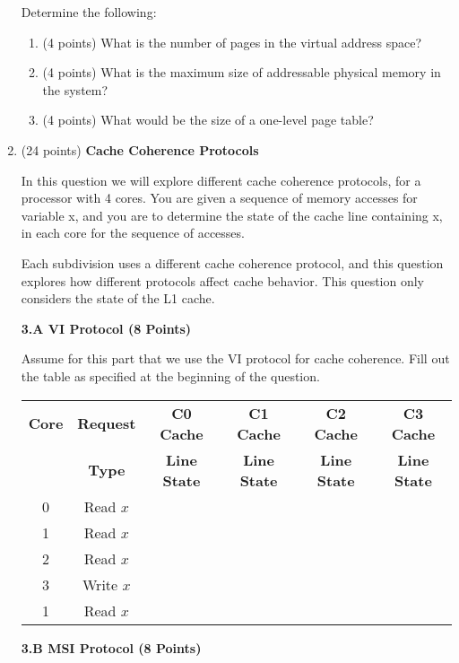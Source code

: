 \documentclass[a4paper,10pt]{article}
\begin{document}
\begin{enumerate}
Determine the following:
\begin{enumerate}
    \item (4 points) What is the number of pages in the virtual address space?

    \item (4 points) What is the maximum size of addressable physical memory in the system?

    \item (4 points) What would be the size of a one-level page table?
\end{enumerate}

\item (24 points) \textbf{Cache Coherence Protocols}

In this question we will explore different cache coherence protocols, for a processor with 4 cores. You are given a sequence of memory accesses for variable x, and you are to determine the state of the cache line containing x, in each core for the sequence of accesses.

Each subdivision uses a different cache coherence protocol, and this question explores how different protocols affect cache behavior. This question only considers the state of the L1 cache.

\textbf{3.A VI Protocol (8 Points)}

Assume for this part that we use the VI protocol for cache coherence. Fill out the table as specified at the beginning of the question.

\begin{center}
\begin{tabular}{|c|c|c|c|c|c|}
\hline
\textbf{Core} & \textbf{Request} & \textbf{C0 Cache} & \textbf{C1 Cache} & \textbf{C2 Cache} & \textbf{C3 Cache} \\
 & \textbf{Type} & \textbf{Line State} & \textbf{Line State} & \textbf{Line State} & \textbf{Line State} \\
\hline
0 & Read $x$ &   &   &   &   \\
\hline
1 & Read $x$ &   &   &   &   \\
\hline
2 & Read $x$ &   &   &   &   \\
\hline
3 & Write $x$ &   &   &   &   \\
\hline
1 & Read $x$ &   &   &   &   \\
\hline
\end{tabular}
\end{center}

\textbf{3.B MSI Protocol (8 Points)}


\end{enumerate}
\end{document}
